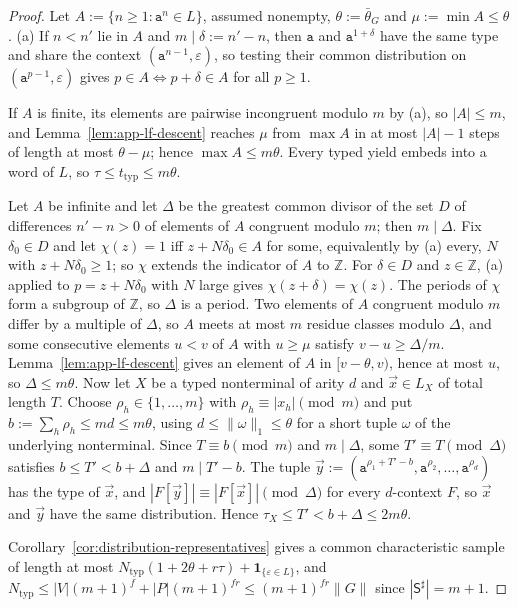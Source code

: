 \documentclass[11pt]{article}
\numberwithin{equation}{section}
\theoremstyle{plain}
\theoremstyle{definition}
\theoremstyle{remark}
\newcommand{\tuple}[1]{\vec{#1}}
\newcommand{\eps}{\varepsilon}
\theoremstyle{plain}
\begin{document}
\begin{proof}
Let $A:=\{n\ge1:\mathtt a^n\in L\}$, assumed nonempty, $\theta:=\bar\theta_G$ and
$\mu:=\min A\le\theta$.  (a) If $n<n'$ lie in $A$ and $m\mid\delta:=n'-n$, then
$\mathtt a$ and $\mathtt a^{1+\delta}$ have the same type and share the context
$(\mathtt a^{n-1},\eps)$, so testing their common distribution on
$(\mathtt a^{p-1},\eps)$ gives $p\in A\iff p+\delta\in A$ for all $p\ge1$.

If $A$ is finite, its elements are pairwise incongruent modulo $m$ by (a), so
$|A|\le m$, and Lemma~\ref{lem:app-lf-descent} reaches $\mu$ from $\max A$ in
at most $|A|-1$ steps of length at most $\theta-\mu$; hence $\max A\le m\theta$.
Every typed yield embeds into a word of $L$, so $\tau\le t_{\mathrm{typ}}\le m\theta$.

Let $A$ be infinite and let $\Delta$ be the greatest common divisor of the set $D$ of
differences $n'-n>0$ of elements of $A$ congruent modulo $m$; then $m\mid\Delta$.
Fix $\delta_0\in D$ and let $\chi(z)=1$ iff $z+N\delta_0\in A$ for some, equivalently
by (a) every, $N$ with $z+N\delta_0\ge1$; so $\chi$ extends the indicator of $A$ to
$\mathbb Z$.  For $\delta\in D$ and $z\in\mathbb Z$, (a) applied to $p=z+N\delta_0$ with $N$
large gives $\chi(z+\delta)=\chi(z)$.  The periods of $\chi$ form a subgroup of
$\mathbb Z$, so $\Delta$ is a period.  Two elements of $A$ congruent modulo $m$ differ by a multiple of $\Delta$, so
$A$ meets at most $m$ residue classes modulo $\Delta$, and some consecutive elements
$u<v$ of $A$ with $u\ge\mu$ satisfy $v-u\ge\Delta/m$.  Lemma~\ref{lem:app-lf-descent}
gives an element of $A$ in $[v-\theta,v)$, hence at most $u$, so $\Delta\le m\theta$.
Now let $X$ be a typed nonterminal of arity $d$ and $\tuple x\in L_X$ of total
length $T$.  Choose $\rho_h\in\{1,\ldots,m\}$ with $\rho_h\equiv|x_h|\pmod m$ and
put $b:=\sum_h\rho_h\le md\le m\theta$, using $d\le\|\omega\|_1\le\theta$ for a short
tuple $\omega$ of the underlying nonterminal.  Since $T\equiv b\pmod m$ and
$m\mid\Delta$, some $T'\equiv T\pmod\Delta$ satisfies $b\le T'<b+\Delta$ and $m\mid T'-b$.  The
tuple $\tuple y:=(\mathtt a^{\rho_1+T'-b},\mathtt a^{\rho_2},\ldots,\mathtt a^{\rho_d})$
has the type of $\tuple x$, and $|F[\tuple y]|\equiv|F[\tuple x]|\pmod\Delta$ for every
$d$-context $F$, so $\tuple x$ and $\tuple y$ have the same distribution.  Hence
$\tau_X\le T'<b+\Delta\le2m\theta$.

Corollary~\ref{cor:distribution-representatives} gives a common characteristic
sample of length at most $N_{\mathrm{typ}}(1+2\theta+r\tau)+\mathbf 1_{\{\eps\in L\}}$,
and $N_{\mathrm{typ}}\le|V|(m+1)^f+|P|(m+1)^{fr}\le(m+1)^{fr}\|G\|$ since
$|\mathsf S^\sharp|=m+1$.
\end{proof}
\end{document}
